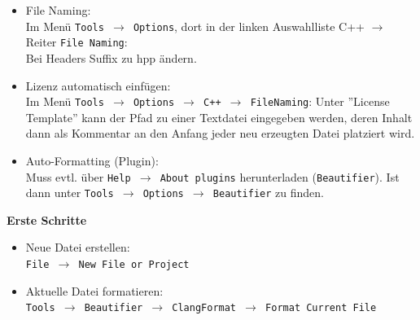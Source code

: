 \begin{itemize}
	\item File Naming:\\
  Im Menü \texttt{Tools $\rightarrow$ Options}, dort in der linken Auswahlliste C++ $\rightarrow$
  Reiter \texttt{File Naming}:\\ Bei Headers Suffix zu hpp ändern.

	\item Lizenz automatisch einfügen:\\

  Im Menü \texttt{Tools $\rightarrow$ Options $\rightarrow$ C++ $\rightarrow$ FileNaming}: Unter ''License
  Template'' kann der Pfad zu einer Textdatei eingegeben werden, deren Inhalt
  dann als Kommentar an den Anfang jeder neu erzeugten Datei platziert wird.

	\item Auto-Formatting (Plugin):\\

  Muss evtl. über \texttt{Help $\rightarrow$ About plugins} herunterladen (\texttt{Beautifier}).
  Ist dann unter \texttt{Tools $\rightarrow$ Options $\rightarrow$ Beautifier} zu finden.
  \end{itemize}
\textbf{Erste Schritte}\\
\begin{itemize}
	\item Neue Datei erstellen:\\
	\texttt{File $\rightarrow$ New File or Project}
	\item Aktuelle Datei formatieren:\\
	\texttt{Tools $\rightarrow$ Beautifier $\rightarrow$ ClangFormat $\rightarrow$ Format Current File}
\end{itemize}
